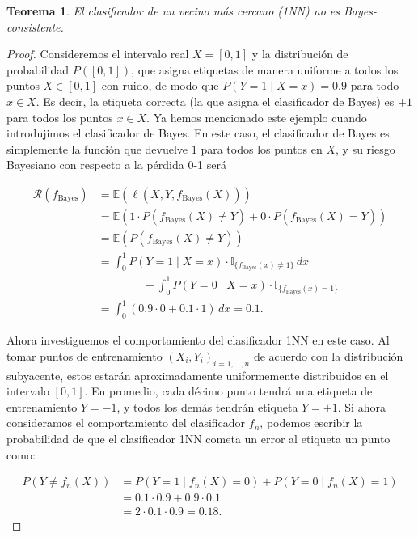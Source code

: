 \documentclass{report}
\newtheorem{thm}{Teorema}[section]
\begin{document}
\begin{thm}
    El clasificador de un vecino más cercano (1NN) no es Bayes-consistente.
\end{thm}

\begin{proof}

Consideremos 
el intervalo real \(X = [0, 1]\) y la distribución de probabilidad \(P([0, 1])\),  que asigna etiquetas 
de manera uniforme a todos los puntos \(X \in [0, 1]\) con ruido, de modo que 
\(P(Y = 1 \mid X = x) = 0.9\) para todo \(x \in X\). Es decir, la etiqueta correcta (la que 
asigna el clasificador de Bayes) es \(+1\) para todos los puntos \(x \in X\). Ya hemos mencionado 
este ejemplo cuando introdujimos el clasificador de Bayes. En este caso, el clasificador de Bayes 
es simplemente la función que devuelve \(1\) para todos los puntos en \(X\), y su riesgo Bayesiano 
con respecto a la pérdida 0-1 será

\[
\begin{aligned}
    \mathcal{R}(f_{\text{Bayes}}) & = \mathbb{E}(\ell(X,Y,f_{\text{Bayes}}(X))) \\
    & = \mathbb{E}(1\cdot P(f_{\text{Bayes}}(X)\neq Y) + 0 \cdot P(f_{\text{Bayes}}(X) = Y))\\
    & = \mathbb{E}(P(f_{\text{Bayes}}(X)\neq Y))\\
    & = \int_{0}^{1} P(Y = 1 \mid X = x) \cdot \mathbb{I}_{\{f_{\text{Bayes}}(x) \neq 1\}} \, dx \\
    & \qquad \qquad + \int_{0}^{1} P(Y=0 \mid X=x) \cdot \mathbb{I}_{\{f_{\text{Bayes}}(x) = 1\}} \\
    & = \int_{0}^{1} (0.9 \cdot 0 + 0.1 \cdot 1) \, dx = 0.1.
\end{aligned}
\]

Ahora investiguemos el comportamiento del clasificador 1NN 
en este caso. Al tomar puntos de entrenamiento \((X_i, Y_i)_{i=1,\dots,n}\) de acuerdo con la 
distribución subyacente, estos estarán aproximadamente uniformemente distribuidos en el intervalo 
\([0, 1]\). En promedio, cada décimo punto tendrá una etiqueta de entrenamiento \(Y = -1\), y todos 
los demás tendrán etiqueta \(Y = +1\). Si ahora consideramos el comportamiento del clasificador \(f_n\), 
podemos escribir la probabilidad de que el clasificador 1NN cometa un error al etiqueta un punto como:

\[
\begin{aligned}
P(Y \neq f_n(X)) & = P(Y = 1 \mid f_n(X) = 0) + P(Y = 0 \mid f_n(X) = 1) \\
                 & = 0.1 \cdot 0.9 + 0.9 \cdot 0.1 \\
                 & = 2 \cdot 0.1 \cdot 0.9 = 0.18.
\end{aligned}
\]


\end{proof}
\end{document}
